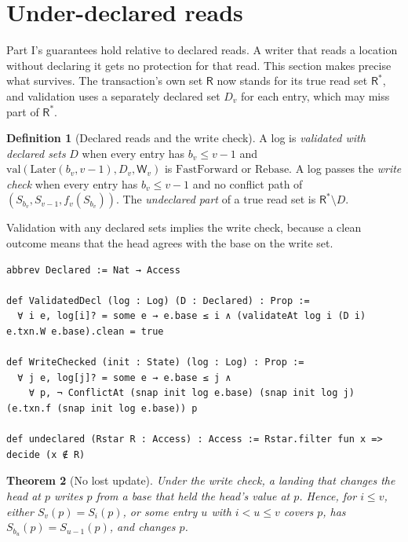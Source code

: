 \documentclass[11pt,letterpaper]{article}
\newtheorem{theorem}{Theorem}[section]
\theoremstyle{definition}
\newtheorem{definition}[theorem]{Definition}
\theoremstyle{remark}
\newcommand{\R}{\mathsf{R}}
\newcommand{\W}{\mathsf{W}}
\newcommand{\Snap}[1]{S_{#1}}
\newcommand{\Later}{\mathrm{Later}}
\newcommand{\op}[1]{\mathrm{#1}}
\newcommand{\val}{\op{val}}
\newcommand{\FF}{\mathrm{FastForward}}
\newcommand{\Rb}{\mathrm{Rebase}}
\begin{document}
\section{Under-declared reads}
\label{sec:mcbl:underdeclared}

Part I's guarantees hold relative to declared reads. A writer that reads a location without declaring it gets no protection for that read. This section makes precise what survives. The transaction's own set $\R$ now stands for its true read set $\R^{*}$, and validation uses a separately declared set $D_v$ for each entry, which may miss part of $\R^{*}$.

\begin{definition}[Declared reads and the write check]
\label{def:mcbl:underdeclared}
A log is \emph{validated with declared sets} $D$ when every entry has $b_v\leq v-1$ and $\val(\Later(b_v,v-1),D_v,\W_v)$ is $\FF$ or $\Rb$. A log passes the \emph{write check} when every entry has $b_v\leq v-1$ and no conflict path of $(\Snap{b_v},\Snap{v-1},f_v(\Snap{b_v}))$. The \emph{undeclared part} of a true read set is $\R^{*}\setminus D$.
\end{definition}

Validation with any declared sets implies the write check, because a clean outcome means that the head agrees with the base on the write set.

\begin{lstlisting}[language=Lean,caption={Declared reads and the write check (\texttt{YonedaTx/UnderDeclared.lean})},label={lst:mcbl:uddefs}]
abbrev Declared := Nat → Access

def ValidatedDecl (log : Log) (D : Declared) : Prop :=
  ∀ i e, log[i]? = some e → e.base ≤ i ∧ (validateAt log i (D i) e.txn.W e.base).clean = true

def WriteChecked (init : State) (log : Log) : Prop :=
  ∀ j e, log[j]? = some e → e.base ≤ j ∧
    ∀ p, ¬ ConflictAt (snap init log e.base) (snap init log j) (e.txn.f (snap init log e.base)) p

def undeclared (Rstar R : Access) : Access := Rstar.filter fun x => decide (x ∉ R)
\end{lstlisting}

\begin{theorem}[No lost update]
\label{thm:mcbl:udnlu}
Under the write check, a landing that changes the head at $p$ writes $p$ from a base that held the head's value at $p$. Hence, for $i\leq v$, either $\Snap{v}(p)=\Snap{i}(p)$, or some entry $u$ with $i<u\leq v$ covers $p$, has $\Snap{b_u}(p)=\Snap{u-1}(p)$, and changes $p$.
\end{theorem}
\end{document}
